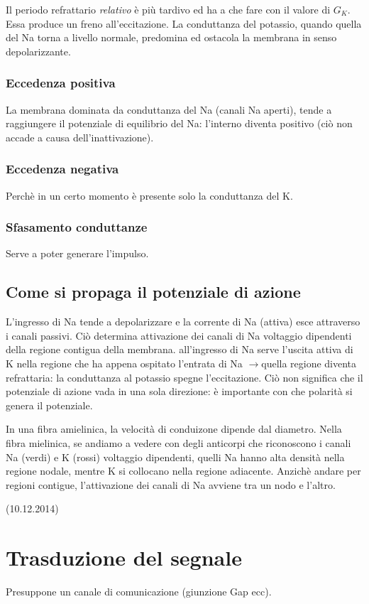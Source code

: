 \documentclass[a4paper,12pt]{article}
\newcommand{\lfreccia}{\ensuremath{\longrightarrow}}
\begin{document}
Il periodo refrattario \emph{relativo} è più tardivo ed ha a che fare con il valore di $G_{K}$. Essa produce un freno all'eccitazione. La conduttanza del potassio, quando quella del Na torna a livello normale, predomina ed ostacola la membrana in senso depolarizzante.

\subsubsection{Eccedenza positiva}
La membrana dominata da conduttanza del Na (canali Na aperti), tende a raggiungere il potenziale di equilibrio del Na: l'interno diventa positivo (ciò non accade a causa dell'inattivazione).

\subsubsection{Eccedenza negativa}
Perchè in un certo momento è presente solo la conduttanza del K.

\subsubsection{Sfasamento conduttanze}
Serve a poter generare l'impulso.

\subsection{Come si propaga il potenziale di azione}
L'ingresso di Na tende a depolarizzare e la corrente di Na (attiva) esce attraverso i canali passivi. Ciò determina attivazione dei canali di Na voltaggio dipendenti della regione contigua della membrana. all'ingresso di Na serve l'uscita attiva di K nella regione che ha appena ospitato l'entrata di Na \lfreccia quella regione diventa refrattaria: la conduttanza al potassio spegne l'eccitazione. Ciò non significa che il potenziale di azione vada in una sola direzione: è importante con che polarità si genera il potenziale. 

In una fibra amielinica, la velocità di conduizone dipende dal diametro. Nella fibra mielinica, se andiamo a vedere con degli anticorpi che riconoscono i canali Na (verdi) e K (rossi) voltaggio dipendenti, quelli Na hanno alta densità nella regione nodale, mentre K si collocano nella regione adiacente. Anzichè andare per regioni contigue, l'attivazione dei canali di Na avviene tra un nodo e l'altro.

(10.12.2014)
\section{Trasduzione del segnale}
Presuppone un canale di comunicazione (giunzione Gap ecc).
\end{document}
